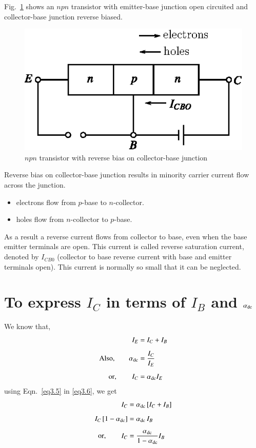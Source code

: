 Fig.~\ref{fig3.12} shows an $npn$ transistor with emitter-base junction open circuited and collector-base junction reverse biased.
\begin{figure}[H]
\centering
\includegraphics{chap2/fig2.12.eps}
\caption{$npn$ transistor with reverse bias on collector-base junction}\label{fig3.12}
\end{figure}

Reverse bias on collector-base junction results in minority carrier current flow across the junction.
\begin{itemize}
\item electrons flow from $p$-base to $n$-collector.

\item holes flow from $n$-collector to $p$-base.
\end{itemize}

As a result a reverse current flows from collector to base, even when the base emitter terminals are open. This current is called reverse saturation current, denoted by $I_{CB0}$ (collector to base reverse current with base and emitter terminals open). This current is normally so small that it can be neglected. 

\section[To express $I_{C}$ in terms of $I_{B}$ and $\alpha_{\dc}$]{To express \boldmath$I_{C}$ in terms of $I_{B}$ and $\alpha_{\dc}$}\label{sec3.10}

We know that,
\begin{align}
I_{E} &=I_{C}+I_{B}\label{eq3.5}\\[5pt]
\text{Also,}\qquad \alpha_{\operatorname{dc}} &= \frac{I_{C}}{I_{E}}\notag\\[5pt]
\text{or},\qquad I_{C} &= \alpha_{\operatorname{dc}}I_{E}\label{eq3.6}
\end{align}
using Eqn.~\eqref{eq3.5} in \eqref{eq3.6}, we get
\begin{align}
I_{C} &= \alpha_{\operatorname{dc}}\,[I_{C}+I_{B}]\notag\\[5pt]
I_{C}\,[1-\alpha_{\operatorname{dc}}] &= \alpha_{\operatorname{dc}}\,I_{B}\notag\\[5pt]
\text{or},\qquad I_{C} &= \frac{\alpha_{\operatorname{dc}}}{1-\alpha_{\operatorname{dc}}}I_{B}\label{eq3.7}
\end{align}

